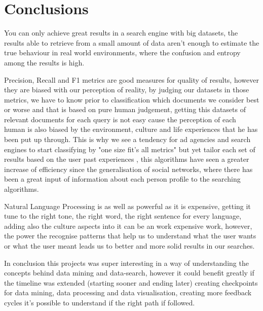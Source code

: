 \documentclass{acm_proc_article-sp}
\begin{document}
\section{Conclusions}

You can only achieve great results in a search engine with big datasets, the results able to retrieve from a small amount of data aren't enough to estimate the true behaviour in real world environments, where the confusion and entropy among the results is high.

Precision, Recall and F1 metrics are good measures for quality of results, however they are biased with our perception of reality, by judging our datasets in those metrics, we have to know prior to classification which documents we consider best or worse and that is based on pure human judgement, getting this datasets of relevant documents for each query is not easy cause the perception of each human is also biased by the environment, culture and life experiences that he has been put up through. This is why we see a tendency for ad agencies and search engines to start classifying by "one size fit's all metrics" but yet tailor each set of results based on the user past experiences , this algorithms have seen a greater increase of efficiency since the generalisation of social networks, where there has been a great input of information about each person profile to the searching algorithms.

Natural Language Processing is as well as powerful as it is expensive, getting it tune to the right tone, the right word, the right sentence for every language, adding also the culture aspects into it can be an work expensive work, however, the power the recognise patterns that help us to understand what the user wants or what the user meant leads us to better and more solid results in our searches.

In conclusion this projects was super interesting in a way of understanding the concepts behind data mining and data-search, however it could benefit greatly if the timeline was extended (starting sooner and ending later) creating checkpoints for data mining, data processing and data visualisation, creating more feedback cycles it's possible to understand if the right path if followed.



\end{document}
